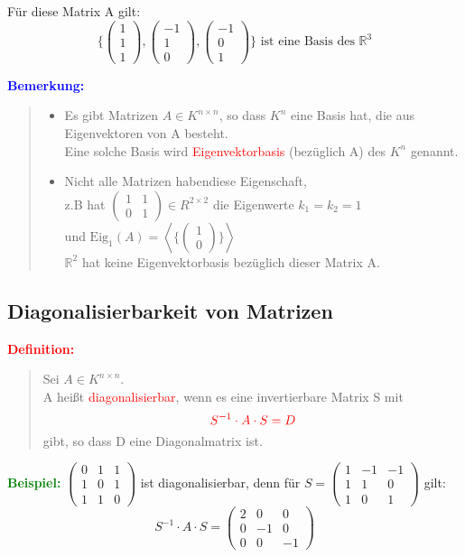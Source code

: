 \documentclass{article}
\newcommand{\red}[1]{\textcolor{red}{#1}}
\newcommand{\blue}[1]{\textcolor{blue}{#1}}
\newcommand{\green}[1]{\textcolor{green}{#1}}
\newcommand{\ex}{\green{\textbf{Beispiel: }}}
\newcommand{\de}[1]{\red{\textbf{Definition: }}\begin{quote}#1\end{quote}}
\newcommand{\an}[1]{\blue{\textbf{Bemerkung: }}\begin{quote}#1\end{quote}}
\newcommand{\R}{\mathbb{R}}
\newcommand{\vvec}[2]{\begin{pmatrix}#1\\#2\end{pmatrix}}
\newcommand{\vvvec}[3]{\begin{pmatrix}#1\\#2\\#3\end{pmatrix}}
\newcommand{\spann}[1]{\left\langle#1\right\rangle}
\newcommand{\eig}{\text{Eig}}
\begin{document}
Für diese Matrix A gilt:
\[
    \{\vvvec{1}{1}{1}, \vvvec{-1}{1}{0}, \vvvec{-1}{0}{1}\} \text{ ist eine Basis des } \R^3
\]

\an{
    \begin{itemize}
        \item Es gibt Matrizen $A \in K^{n \times n}$, so dass $K^n$ eine Basis hat, die aus Eigenvektoren von A besteht.\\
        Eine solche Basis wird \red{Eigenvektorbasis} (bezüglich A) des $K^n$ genannt.
        \item Nicht alle Matrizen habendiese Eigenschaft, \\
        z.B hat $\begin{pmatrix}
            1 & 1\\
            0 & 1
        \end{pmatrix} \in R^{2 \times 2}$ die Eigenwerte $k_1 = k_2 = 1$\\
        und $\eig_1(A) = \spann{\{\vvec{1}{0}\}}$\\
        $\R^2$ hat keine Eigenvektorbasis bezüglich dieser Matrix A.
    \end{itemize}
}

\newpage
\subsection{Diagonalisierbarkeit von Matrizen}

\de{
    Sei $A \in K^{n \times n}$.\\
    A heißt \red{diagonalisierbar}, wenn es eine invertierbare Matrix S mit
    \[
        \red{S^{-1} \cdot A \cdot S = D}
    \]
    gibt, so dass D eine Diagonalmatrix ist.
}

\ex $\begin{pmatrix}
    0 & 1 & 1\\
    1 & 0 & 1\\
    1 & 1 & 0
\end{pmatrix}$ ist diagonalisierbar, denn für $S = \begin{pmatrix}
    1 & -1 & -1\\
    1 & 1 & 0\\
    1 & 0 & 1
\end{pmatrix}$ gilt:
\[
    S^{-1} \cdot A \cdot S = \begin{pmatrix}
        2 & 0 & 0\\
        0 & -1 & 0\\
        0 & 0 & -1
    \end{pmatrix}
\]
\end{document}
